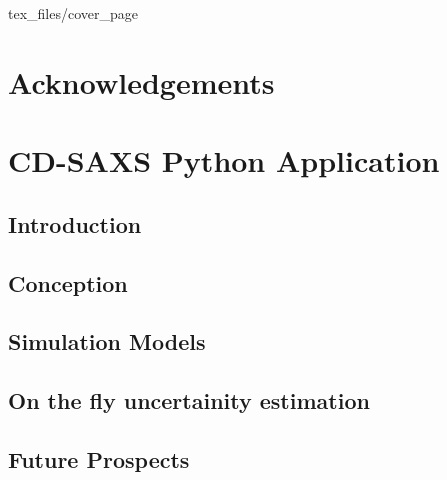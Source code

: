 \documentclass[12pt]{article}
\begin{document}
 {tex_files/cover_page}

\newpage
\section*{Acknowledgements}

\medskip


\newpage

\tableofcontents









\section{CD-SAXS Python Application}
\subsection{Introduction}
\subsection{Conception}
\subsection{Simulation Models}
\subsection{On the fly uncertainity estimation}
\subsection{Future Prospects}

\newpage

\printbibliography
\end{document}
